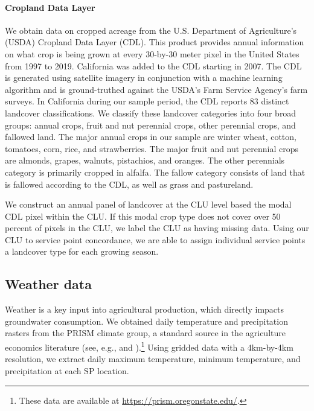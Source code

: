 \paragraph{Cropland Data Layer} We obtain data on cropped acreage from the U.S. Department of Agriculture's (USDA) Cropland Data Layer (CDL). This 
product provides annual information on what crop is being grown at every 30-by-30 meter pixel in the United States from 1997 to 2019. California was added to the CDL starting in 2007. The CDL is generated using satellite imagery in conjunction with a machine learning algorithm and is ground-truthed against the USDA's Farm Service Agency's farm surveys. In California during our sample period, the CDL reports 83 distinct landcover classifications. We classify these landcover categories into four broad groups: annual crops, fruit and nut perennial crops, other perennial crops, and fallowed land. The major annual crops in our sample are winter wheat, cotton, tomatoes, corn, rice, and strawberries. The major fruit and nut perennial crops are almonds, grapes, walnuts, pistachios, and oranges. The other perennials category is primarily cropped in alfalfa. The fallow category consists of land that is fallowed according to the CDL, as well as grass and pastureland.%

We construct an annual panel of landcover at the CLU level based the modal CDL pixel within the CLU. If this modal crop type does not cover over 50 percent of pixels in the CLU, we label the CLU as having missing data. Using our CLU to service point concordance, we are able to assign individual service points a landcover type for each growing season.

\subsection{Weather data}
Weather is a key input into agricultural production, which directly impacts groundwater consumption. We obtained daily temperature and precipitation rasters from the PRISM climate group, a standard source in the agriculture economics literature (see, e.g., \textcite{schlenker2009} and \textcite{burke2016}).\footnote{These data are available at \url{https://prism.oregonstate.edu/}. } Using gridded data with a 4km-by-4km resolution, we extract daily maximum temperature, minimum temperature, and precipitation at each SP location.
